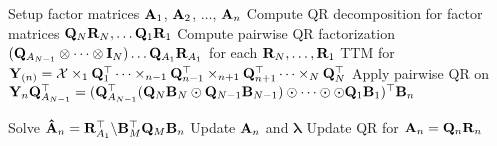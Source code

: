 \begin{algorithmic}[1]
      \State Setup factor matrices  $\mathbf{A}_1$, $\mathbf{A}_2$, $\dots$, $\mathbf{A}_n$
      \State Compute QR decomposition for factor matrices $\mathbf{Q}_N\mathbf{R}_N, \dots \mathbf{Q}_1\mathbf{R}_1$
      \State Compute pairwise QR factorization $(\mathbf{Q}_{A_{N-1}} \otimes \dots  \otimes  \mathbf{I}_N) \dots \mathbf{Q}_{A_{1}}\mathbf{R}_{A_{1}}$ for each $\mathbf{R}_N, \dots, \mathbf{R}_1$
      \State TTM for $\mathbf{Y}_{(n)} =  {\mathbf{\cal{X}}} \times_1 \mathbf{Q}_1^\top \dots \times_{n-1} \mathbf{Q}_{n-1}^\top \times_{n+1} \mathbf{Q}_{n+1}^\top \dots \times_N \mathbf{Q}_N^\top$ \label{l:Pair-TTM}
      \State Apply pairwise QR on $\mathbf{Y}_n\mathbf{Q}_{A_{N-1}}^\top  = (\mathbf{Q}_{A_{N-1}}^\top(\mathbf{Q}_N\mathbf{B}_N \odot \mathbf{Q}_{N-1}\mathbf{B}_{N-1}) \odot \dots \odot  \odot \mathbf{Q}_{1}\mathbf{B}_{1})^\top\mathbf{B}_n $
      
      \State Solve $  \mathbf{\hat{A}}_n = \mathbf{R}^\top_{A_1} \text{\textbackslash} \mathbf{B}^\top_M\mathbf{Q}_M\mathbf{B}_n $
      \State Update $\mathbf{A}_n$ and $\bm{\lambda}$
      \State Update QR for $\mathbf{A}_n = \mathbf{Q}_n\mathbf{R}_n$      
      \EndFor
      \EndWhile
    \EndFunction
  \end{algorithmic}